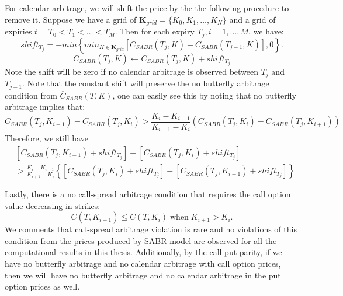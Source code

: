 \documentclass[letterpaper,12pt,titlepage,oneside,final]{book}
\numberwithin{equation}{section}
\theoremstyle{definition}
\begin{document}
For calendar arbitrage, we will shift the price by the the following procedure to remove it. Suppose we have a grid of $\mathbf{K}_{grid}=\{K_0,K_1,\dots,K_{N}\}$ and  a grid of expiries $t=T_0 < T_1 < \dots< T_{M}$. Then for each expiry  $T_j,i=1,\dots,M$, we have:
\[
shift_{T_j}=-min\left\{min_{K \in \mathbf{K}_{grid}}\left[\overline{C}_{SABR}(T_j,K)-\overline{C}_{SABR}(T_{j-1},K)\right],0\right\}.	
\]
\[
	\widetilde {C_{SABR}}(T_j,K) \leftarrow \overline{C}_{SABR}(T_j,K)+shift_{T_j}
\]
 Note the shift will be zero if no calendar arbitrage is observed between $T_{j}$ and $T_{j-1}$. Note that the constant shift will preserve the no butterfly arbitrage condition from $\overline{C}_{SABR}(T,K)$, one can easily see this by noting that no butterfly arbitrage implies that:	 
 \[
		\overline{C}_{SABR}(T_{j},K_{i-1})- \overline{C}_{SABR}(T_{j},K_{i}) > \frac{K_i-K_{i-1}}{K_{i+1}-K_{i}}
	\left(  \overline{C}_{SABR}(T_{j},K_{i})- \overline{C}_{SABR}(T_{j},K_{i+1})  \right)
\]
Therefore, we still have
\[
\begin{split}
	&[\overline{C}_{SABR}(T_{j},K_{i-1})+shift_{T_j}]- [\overline{C}_{SABR}(T_{j},K_{i})+shift_{T_j}] \\
	&> \frac{K_i-K_{i-1}}{K_{i+1}-K_{i}}
	\left\{  \left[\overline{C}_{SABR}(T_{j},K_{i})+shift_{T_j}\right]- \left[\overline{C}_{SABR}(T_{j},K_{i+1})+shift_{T_j}\right]  \right\}
\end{split}
\]




 Lastly, there is a no call-spread arbitrage condition that requires the call option value decreasing in strikes:
 \[
	C(T,K_{i+1})\leq C(T,K_{i}) \; \text{when} \; K_{i+1}>K_{i}.
\]
 We comments that call-spread arbitrage violation is rare and no violations of this condition from the prices produced by SABR model  are observed for all the computational results in this thesis. Additionally, by the call-put parity, if we have no butterfly arbitrage and no calendar arbitrage with call option prices, then we will  have  no butterfly arbitrage and no calendar arbitrage in  the put option prices as well.
\end{document}
